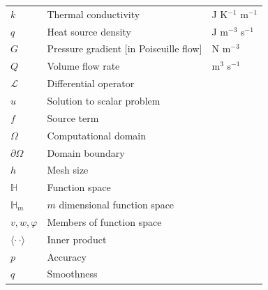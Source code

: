 \begin{center}
\begin{tabular}{p{2cm}p{6cm}p{3cm}}
$k$                             & Thermal conductivity             & J K$^{-1}$ m$^{-1}$ \\
$q$                             & Heat source density              & J m$^{-3}$ s$^{-1}$ \\
$G$                             & Pressure gradient [in Poiseuille flow] & N m$^{-3}$ \\
$Q$                             & Volume flow rate                 & m$^3$ s$^{-1}$ \\
\hline
$\mathcal{L}$                   & Differential operator            & \\
$u$                             & Solution to scalar problem       & \\
$f$                             & Source term                      & \\
$\Omega$                        & Computational domain             & \\
$\partial\Omega$                & Domain boundary                  & \\
$h$                             & Mesh size                        & \\
$\mathbb{H}$                    & Function space                   & \\
$\mathbb{H}_m$                  & $m$ dimensional function space   & \\
$v,w,\varphi$                   & Members of function space        & \\
$\langle\cdot\,\cdot\rangle$    & Inner product                    & \\
$p$                             & Accuracy                         & \\
$q$                             & Smoothness                       & \\
\end{tabular}
\end{center}


\mainmatter %
